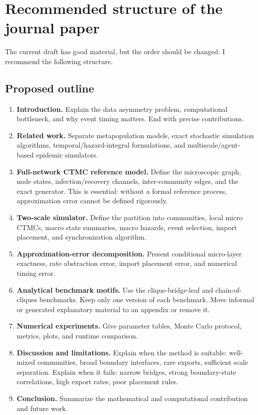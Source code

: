 \documentclass[12pt,a4paper]{article}
\theoremstyle{definition}
\newcommand{\1}{\mathbf{1}}
\begin{document}
\section{Recommended structure of the journal paper}

The current draft has good material, but the order should be changed.  I recommend the following structure.

\subsection{Proposed outline}

\begin{enumerate}
    \item \textbf{Introduction.}
    Explain the data asymmetry problem, computational bottleneck, and why event timing matters.  End with precise contributions.

    \item \textbf{Related work.}
    Separate metapopulation models, exact stochastic simulation algorithms, temporal/hazard-integral formulations, and multiscale/agent-based epidemic simulators.

    \item \textbf{Full-network CTMC reference model.}
    Define the microscopic graph, node states, infection/recovery channels, inter-community edges, and the exact generator.  This is essential: without a formal reference process, approximation error cannot be defined rigorously.

    \item \textbf{Two-scale simulator.}
    Define the partition into communities, local micro CTMCs, macro state summaries, macro hazards, event selection, import placement, and synchronization algorithm.

    \item \textbf{Approximation-error decomposition.}
    Present conditional micro-layer exactness, rate abstraction error, import placement error, and numerical timing error.

    \item \textbf{Analytical benchmark motifs.}
    Use the clique-bridge-leaf and chain-of-cliques benchmarks.  Keep only one version of each benchmark.  Move informal or generated explanatory material to an appendix or remove it.

    \item \textbf{Numerical experiments.}
    Give parameter tables, Monte Carlo protocol, metrics, plots, and runtime comparison.

    \item \textbf{Discussion and limitations.}
    Explain when the method is suitable: well-mixed communities, broad boundary interfaces, rare exports, sufficient scale separation.  Explain when it fails: narrow bridges, strong boundary-state correlations, high export rates, poor placement rules.

    \item \textbf{Conclusion.}
    Summarize the mathematical and computational contribution and future work.
\end{enumerate}
\end{document}
